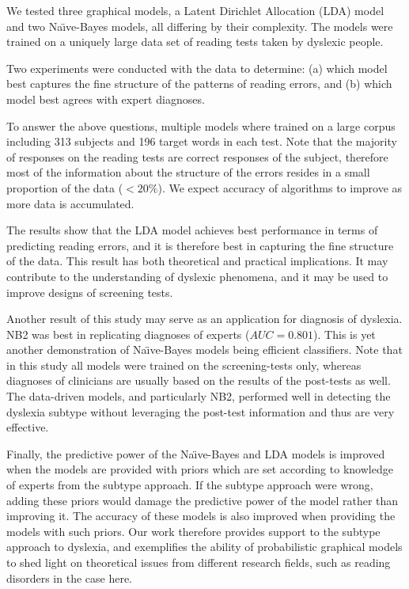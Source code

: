 {{We tested three graphical models, a Latent Dirichlet Allocation (LDA) model and two Na\"{\i}ve-Bayes models, all differing by their complexity. The models were trained on a uniquely large data set of reading tests taken by dyslexic people.

Two experiments were conducted with the data to determine: (a) which model best captures the fine structure of the patterns of reading errors, and (b) which model best agrees with expert diagnoses. 

To answer the above questions, multiple models where train\-ed on a large corpus including 313 subjects and 196 target words in each test. Note that the majority of responses on the reading tests are correct responses of the subject, therefore most of the information about the structure of the errors resides in a small proportion of the data ($<20\%$). We expect accuracy of algorithms to improve as more data is accumulated.

The results show that the LDA model achieves best performance in terms of predicting reading errors, and it is therefore best in capturing the fine structure of the data. This result has both theoretical and practical implications. It may contribute to the understanding of dyslexic phenomena, and it may be used to improve designs of screening tests.

Another result of this study may serve as an application for diagnosis of dyslexia. NB2 was best in replicating diagnoses of experts ($AUC = 0.801$). This is yet another demonstration of Na\"{\i}ve-Bayes models being efficient classifiers. Note that in this study all models were trained on the screening-tests only, whereas diagnoses of clinicians are usually based on the results of the post-tests as well. The data-driven models, and particularly NB2, performed well in detecting the dyslexia subtype without leveraging the post-test information and thus are very effective.

Finally, the predictive power of the Na\"{\i}ve-Bayes and LDA models is improved when the models are provided with priors which are set according to knowledge of experts from the subtype approach. If the subtype approach were wrong, adding these priors would damage the predictive power of the model rather than improving it. The accuracy of these models is also improved when providing the models with such priors. Our work therefore provides support to the subtype approach to dyslexia, and exemplifies the ability of probabilistic graphical models to shed light on theoretical issues from different research fields, such as reading disorders in the case here.

}}
